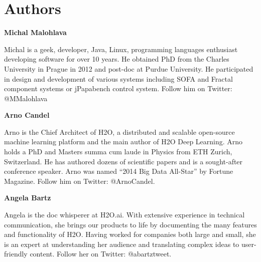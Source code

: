 

\newpage

\section{Authors}

\textbf{Michal Malohlava}

Michal is a geek, developer, Java, Linux, programming languages enthusiast developing software for over 10 years. He obtained PhD from the Charles University in Prague in 2012 and post-doc at Purdue University. He participated in design and development of various systems including SOFA and Fractal component systems or jPapabench control system. Follow him on Twitter: @MMalohlava

\textbf{Arno Candel}

Arno is the Chief Architect of H2O, a distributed and scalable open-source machine learning platform and the main author of H2O Deep Learning.  Arno holds a PhD and Masters summa cum laude in Physics from ETH Zurich, Switzerland. He has authored dozens of scientific papers and is a sought-after conference speaker. Arno was named “2014 Big Data All-Star” by Fortune Magazine. Follow him on Twitter: @ArnoCandel.

\textbf{Angela Bartz}

Angela is the doc whisperer at H2O.ai. With extensive experience in technical communication, she brings our products to life by documenting the many features and functionality of H2O. Having worked for companies both large and small, she is an expert at understanding her audience and translating complex ideas to user-friendly content. Follow her on Twitter: @abartztweet.



